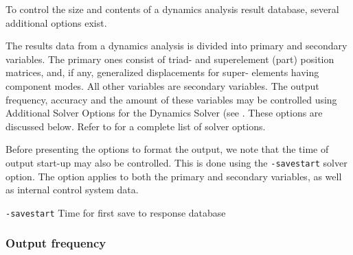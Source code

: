 {



To control the size and contents of a dynamics analysis result database,
several additional options exist.

The results data from a dynamics analysis is divided into primary and
secondary variables. The primary ones consist of triad- and superelement
(part) position matrices, and, if any, generalized displacements for
super- elements having component modes. All other variables are
secondary variables. The output frequency, accuracy and the amount of
these variables may be controlled using Additional Solver Options for
the Dynamics Solver
(see .
These options are discussed below.
Refer to 
for a complete list of solver options.


Before presenting the options to format the output, we note that the
time of output start-up may also be controlled. This is done using the
{\tt-savestart} solver option. The option applies to both the
primary and secondary variables, as well as internal control system data.

{\tt-savestart} \hskip1cm Time for first save to response database


\subsubsection{Output frequency}

}
